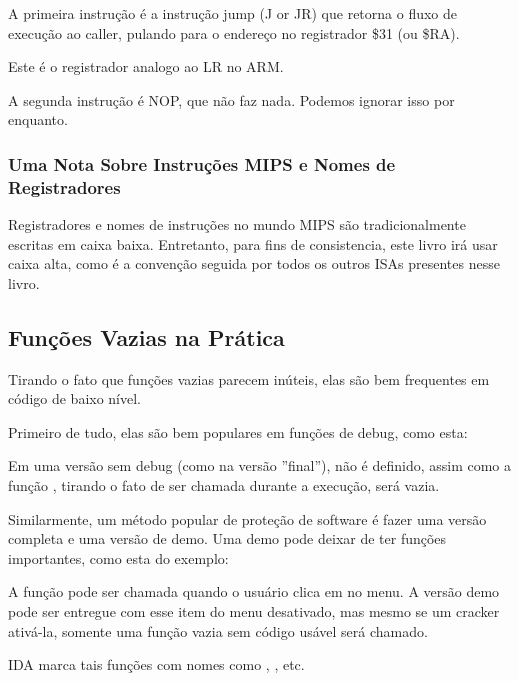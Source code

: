 A primeira instrução é a instrução jump (J or JR) que retorna o fluxo de execução ao \gls{caller},
pulando para o endereço no registrador \$31 (ou \$RA).

Este é o registrador analogo ao \ac{LR} no ARM.

A segunda instrução é \ac{NOP}, que não faz nada.
Podemos ignorar isso por enquanto.

\subsubsection{Uma Nota Sobre Instruções MIPS e Nomes de Registradores}

Registradores e nomes de instruções no mundo MIPS são tradicionalmente escritas em caixa baixa.
Entretanto, para fins de consistencia, este livro irá usar caixa alta,
como é a convenção seguida por todos os outros \ac{ISA}s presentes nesse livro.

\subsection{Funções Vazias na Prática}

Tirando o fato que funções vazias parecem inúteis, elas são bem frequentes em código de baixo nível.

Primeiro de tudo, elas são bem populares em funções de debug, como esta:



Em uma versão sem debug (como na versão ''final''),  não é definido,
assim como a função , tirando o fato de ser chamada durante a execução,
será vazia.

Similarmente, um método popular de proteção de software é fazer uma versão completa e uma versão de demo.
Uma demo pode deixar de ter funções importantes, como esta do exemplo:



A função  pode ser chamada quando o usuário clica em  no menu.
A versão demo pode ser entregue com esse item do menu desativado, mas mesmo se um cracker ativá-la, 
somente uma função vazia sem código usável será chamado.

IDA marca tais funções com nomes como , , etc.

